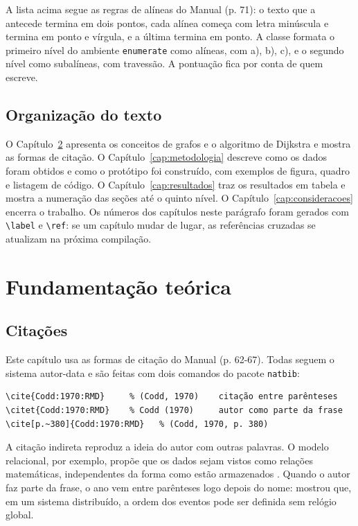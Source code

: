 \documentclass[tcc,capa]{texufpel}
\begin{document}
A lista acima segue as regras de alíneas do Manual (p. 71): o texto que a
antecede termina em dois pontos, cada alínea começa com letra minúscula e
termina em ponto e vírgula, e a última termina em ponto. A classe formata o
primeiro nível do ambiente \texttt{enumerate} como alíneas, com a), b), c), e o
segundo nível como subalíneas, com travessão. A pontuação fica por conta de
quem escreve.

\section{Organização do texto}

O Capítulo~\ref{cap:fundamentacao} apresenta os conceitos de grafos e o
algoritmo de Dijkstra e mostra as formas de citação. O
Capítulo~\ref{cap:metodologia} descreve como os dados foram obtidos e como o
protótipo foi construído, com exemplos de figura, quadro e listagem de código.
O Capítulo~\ref{cap:resultados} traz os resultados em tabela e mostra a
numeração das seções até o quinto nível. O Capítulo~\ref{cap:consideracoes}
encerra o trabalho. Os números dos capítulos neste parágrafo foram gerados com
\verb|\label| e \verb|\ref|: se um capítulo mudar de lugar, as referências
cruzadas se atualizam na próxima compilação.

\chapter{Fundamentação teórica}
\label{cap:fundamentacao}

\section{Citações}
\label{sec:citacoes}

Este capítulo usa as formas de citação do Manual (p. 62-67). Todas seguem o
sistema autor-data e são feitas com dois comandos do pacote \texttt{natbib}:

\begin{lstlisting}[language={[LaTeX]TeX}, numbers=none]
\cite{Codd:1970:RMD}     % (Codd, 1970)    citação entre parênteses
\citet{Codd:1970:RMD}    % Codd (1970)     autor como parte da frase
\cite[p.~380]{Codd:1970:RMD}   % (Codd, 1970, p. 380)
\end{lstlisting}

A citação indireta reproduz a ideia do autor com outras palavras. O modelo
relacional, por exemplo, propõe que os dados sejam vistos como relações
matemáticas, independentes da forma como estão armazenados
\citep{Codd:1970:RMD}. Quando o autor faz parte da frase, o ano vem entre
parênteses logo depois do nome: \citet{Lamport:1978:TCO} mostrou que, em um
sistema distribuído, a ordem dos eventos pode ser definida sem relógio
global.
\end{document}
